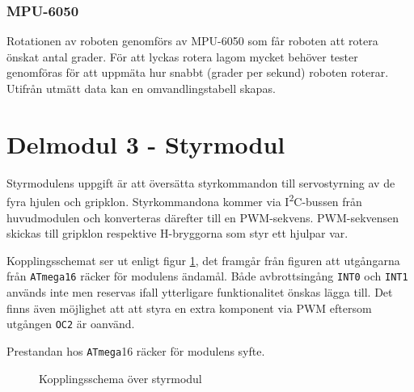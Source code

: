 \documentclass[11pt]{article}
\begin{document}
\begin{flushleft}
\subsubsection{MPU-6050}
Rotationen av roboten genomförs av MPU-6050 som får roboten att rotera önskat antal grader. För att lyckas rotera lagom mycket behöver tester genomföras för att uppmäta hur snabbt (grader per sekund) roboten roterar. Utifrån utmätt data kan en omvandlingstabell skapas.

\pagebreak
\section{Delmodul 3 - Styrmodul}
Styrmodulens uppgift är att översätta styrkommandon till servostyrning av de fyra hjulen och gripklon. Styrkommandona kommer via I\textsuperscript{2}C-bussen från huvudmodulen och konverteras därefter till en PWM-sekvens. PWM-sekvensen skickas till gripklon respektive H-bryggorna som styr ett hjulpar var. 

Kopplingsschemat ser ut enligt figur \ref{kopplingsschema:styrmodul}, det framgår från figuren att utgångarna från \verb+ATmega16+ räcker för modulens ändamål. Både avbrottsingång \verb+INT0+ och \verb+INT1+ används inte men reservas ifall ytterligare funktionalitet önskas lägga till. Det finns även möjlighet att att styra en extra komponent via PWM eftersom utgången \verb+OC2+ är oanvänd.  

Prestandan hos \verb+ATmega+16 räcker för modulens syfte. 

\begin{figure}[htbp]
\centering
\noindent{}
	\caption{Kopplingsschema över styrmodul \label{kopplingsschema:styrmodul}}	
\end{figure}
 

\end{flushleft}
\end{document}
